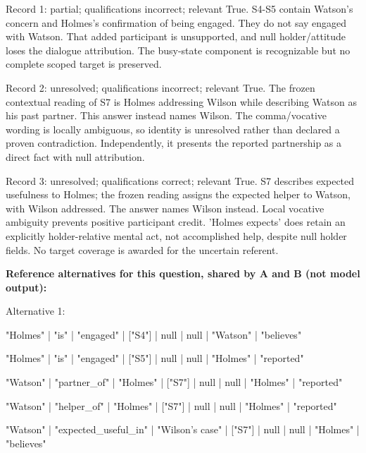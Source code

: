 \noindent Record 1: partial; qualifications incorrect; relevant True. S4-S5 contain Watson's concern and Holmes's confirmation of being engaged. They do not say engaged with Watson. That added participant is unsupported, and null holder/attitude loses the dialogue attribution. The busy-state component is recognizable but no complete scoped target is preserved.\par\smallskip

\noindent Record 2: unresolved; qualifications incorrect; relevant True. The frozen contextual reading of S7 is Holmes addressing Wilson while describing Watson as his past partner. This answer instead names Wilson. The comma/vocative wording is locally ambiguous, so identity is unresolved rather than declared a proven contradiction. Independently, it presents the reported partnership as a direct fact with null attribution.\par\smallskip

\noindent Record 3: unresolved; qualifications correct; relevant True. S7 describes expected usefulness to Holmes; the frozen reading assigns the expected helper to Watson, with Wilson addressed. The answer names Wilson instead. Local vocative ambiguity prevents positive participant credit. 'Holmes expects' does retain an explicitly holder-relative mental act, not accomplished help, despite null holder fields. No target coverage is awarded for the uncertain referent.\par\smallskip

\noindent\textbf{Reference alternatives for this question, shared by A and B (not model output):}

\noindent Alternative 1:

"Holmes" | "is" | "engaged" | ["S4"] | null | null | "Watson" | "believes"\par\smallskip

"Holmes" | "is" | "engaged" | ["S5"] | null | null | "Holmes" | "reported"\par\smallskip

"Watson" | "partner\_of" | "Holmes" | ["S7"] | null | null | "Holmes" | "reported"\par\smallskip

"Watson" | "helper\_of" | "Holmes" | ["S7"] | null | null | "Holmes" | "reported"\par\smallskip

"Watson" | "expected\_useful\_in" | "Wilson's case" | ["S7"] | null | null | "Holmes" | "believes"\par\smallskip

